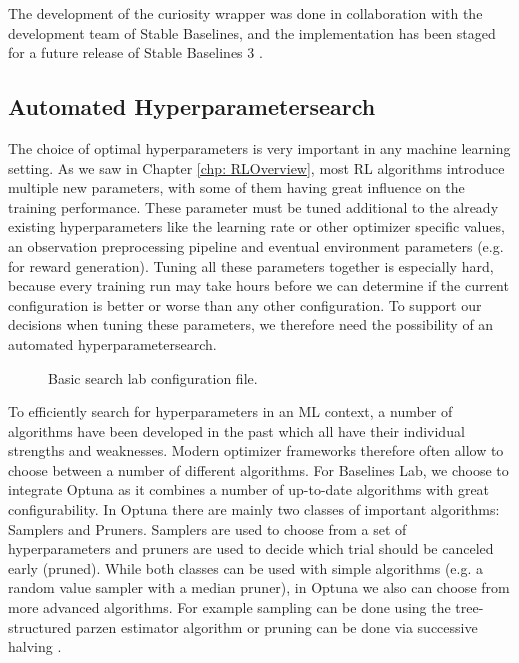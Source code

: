 The development of the curiosity wrapper was done in collaboration with the development team of Stable Baselines, and the implementation has been staged for a future release of Stable Baselines 3 \cite{stable-baselines-intrinsic}.

\subsection{Automated Hyperparametersearch} \label{sec:blSearch}
The choice of optimal hyperparameters is very important in any machine learning setting. As we saw in Chapter \ref{chp: RLOverview}, most RL algorithms introduce multiple new parameters, with some of them having great influence on the training performance. These parameter must be tuned additional to the already existing hyperparameters like the learning rate or other optimizer specific values, an observation preprocessing pipeline and eventual environment parameters (e.g. for reward generation). Tuning all these parameters together is especially hard, because every training run may take hours before we can determine if the current configuration is better or worse than any other configuration. To support our decisions when tuning these parameters, we therefore need the possibility of an automated hyperparametersearch. 

\begin{figure}[ht]
    
    \caption{Basic search lab configuration file.}
    \label{fig:BasicSearchConfig}
\end{figure}

To efficiently search for hyperparameters in an ML context, a number of algorithms have been developed in the past which all have their individual strengths and weaknesses. Modern optimizer frameworks therefore often allow to choose between a number of different algorithms. For Baselines Lab, we choose to integrate Optuna \cite{akiba2019optuna} as it combines a number of up-to-date algorithms with great configurability. In Optuna there are mainly two classes of important algorithms: Samplers and Pruners. Samplers are used to choose from a set of hyperparameters and pruners are used to decide which trial should be canceled early (pruned). While both classes can be used with simple algorithms (e.g. a random value sampler with a median pruner), in Optuna we also can choose from more advanced algorithms. For example sampling can be done using the tree-structured parzen estimator algorithm \cite{bergstra2011algorithms} or pruning can be done via successive halving \cite{karnin2013almost}.

